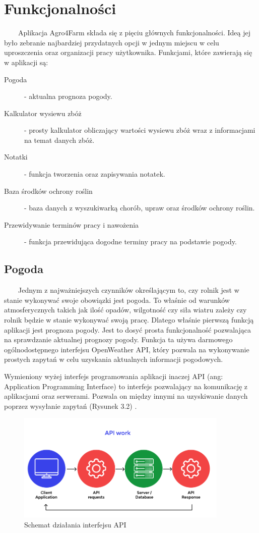 \documentclass[a4paper,12pt,oneside]{book}
\begin{document}
	\section{Funkcjonalności}
	\ \ \ \
	Aplikacja Agro4Farm składa się z pięciu głównych funkcjonalności. Ideą jej było zebranie najbardziej przydatnych opcji w jednym miejscu w celu uproszczenia oraz organizacji pracy użytkownika. Funkcjami, które zawierają się w aplikacji są:
	\begin{description}
		\item[Pogoda] - aktualna prognoza pogody.
		\item[Kalkulator wysiewu zbóż] - prosty kalkulator obliczający wartości wysiewu zbóż wraz z informacjami na temat danych zbóż.
		\item[Notatki] - funkcja tworzenia oraz zapisywania notatek.
		\item[Baza środków ochrony roślin] - baza danych z wyszukiwarką chorób, upraw oraz środków ochrony roślin.
		\item[Przewidywanie terminów pracy i nawożenia] - funkcja przewidująca dogodne terminy pracy na podstawie pogody.
	\end{description}
	
	\newpage
	
	\subsection{Pogoda}
	\ \ \ \
		Jednym z najważniejszych czynników określającym to, czy rolnik jest w stanie wykonywać swoje obowiązki jest pogoda. To właśnie od warunków atmosferycznych takich jak ilość opadów, wilgotność czy siła wiatru zależy czy rolnik będzie w stanie wykonywać swoją pracę. Dlatego właśnie pierwszą funkcją aplikacji jest prognoza pogody. Jest to dosyć prosta funkcjonalność pozwalająca na sprawdzanie aktualnej prognozy pogody. Funkcja ta używa darmowego ogólnodostępnego interfejsu OpenWeather API, który pozwala na wykonywanie prostych zapytań w celu uzyskania aktualnych informacji pogodowych. 
		
		Wymieniony wyżej interfejs programowania aplikacji inaczej API (ang: Application Programming Interface) to interfejs pozwalający na komunikację z aplikacjami oraz serwerami. Pozwala on między innymi na uzyskiwanie danych poprzez wysyłanie zapytań (Rysunek 3.2) \cite{ref13}. 
	
	\begin{figure}[H]
		\centering
		\includegraphics[width=0.9\textwidth]{grafika/api.png}
		\caption{Schemat działania interfejsu API}
	\end{figure}
\end{document}

